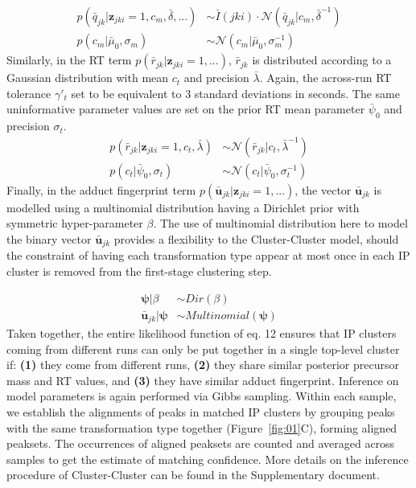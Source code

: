 \begin{align}
p({\bar{q}}_{jk}\vert\boldsymbol{z}_{jki}=1,c_m,\bar{\delta},...) &\sim \bar{I}(jki) \cdot \mathcal{N}(\bar{q}_{jk} \vert c_m,\bar{\delta}^{-1}) \\
p(c_m\vert \bar{\mu}_0,\sigma_m) &\sim \mathcal{N}(c_m \vert \bar{\mu}_0,\sigma_m^{-1})
\end{align}
Similarly, in the RT term $p({\bar{r}}_{jk}\vert\boldsymbol{z}_{jki}=1,...)$, ${\bar{r}}_{jk}$ is distributed according to a Gaussian distribution with mean $c_t$ and precision $\bar{\lambda}$. Again, the across-run RT tolerance $\gamma'_t$ set to be equivalent to 3 standard deviations in seconds. The same uninformative parameter values are set on the prior RT mean parameter $\bar{\psi}_0$ and precision $\sigma_t$.
\begin{align}
p({\bar{r}}_{jk}\vert\boldsymbol{z}_{jki}=1,c_t,\bar{\lambda}) &\sim \mathcal{N}({\bar{r}}_{jk} \vert c_t,\bar{\lambda}^{-1}) \\
p(c_t\vert \bar{\psi}_0,\sigma_t) &\sim \mathcal{N}(c_t \vert \bar{\psi}_0,\sigma_t^{-1})
\end{align}
Finally, in the adduct fingerprint term $p({\boldsymbol{\bar{u}}}_{jk}\vert\boldsymbol{z}_{jki}=1,...)$, the vector ${\boldsymbol{\bar{u}}}_{jk}$ is modelled using a multinomial distribution having a Dirichlet prior with symmetric hyper-parameter $\beta$.  The use of multinomial distribution here to model the binary vector ${\boldsymbol{\bar{u}}}_{jk}$ provides a flexibility to the Cluster-Cluster model, should the constraint of having each transformation type appear at most once in each IP cluster is removed from the first-stage clustering step.

\begin{align}
\boldsymbol{\psi}\vert\beta &\sim Dir(\beta) \\
{\boldsymbol{\bar{u}}}_{jk}\vert\boldsymbol{\psi} &\sim Multinomial(\boldsymbol{\psi})
\end{align}
Taken together, the entire likelihood function of eq. 12 ensures that IP clusters coming from different runs can only be put together in a single top-level cluster if: \textbf{(1)} they come from different runs, \textbf{(2)} they share similar posterior precursor mass and RT values, and \textbf{(3)} they have similar adduct fingerprint. Inference on model parameters is again performed via Gibbs sampling. Within each sample, we establish the alignments of peaks in matched IP clusters by grouping peaks with the same transformation type together (Figure~\ref{fig:01}C), forming aligned peaksets. The occurrences of aligned peaksets are counted and averaged across samples to get the estimate of matching confidence. More details on the inference procedure of Cluster-Cluster can be found in the Supplementary document.

